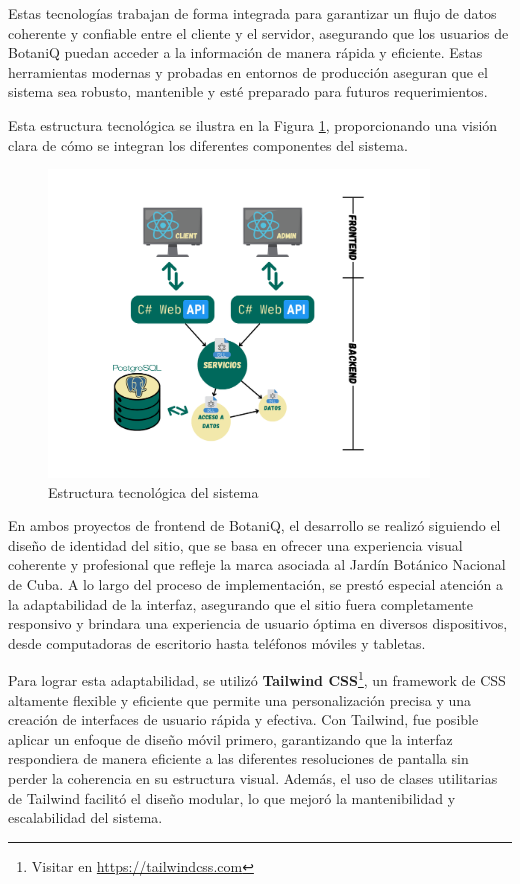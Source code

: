 Estas tecnologías trabajan de forma integrada para garantizar 
un flujo de datos coherente y confiable entre el cliente y el servidor, asegurando que los usuarios de 
BotaniQ puedan acceder a la información de manera rápida y eficiente. Estas herramientas modernas y 
probadas en entornos de producción aseguran que el sistema sea robusto, mantenible y esté preparado para 
futuros requerimientos.

Esta estructura tecnológica se ilustra en la Figura \ref{fig:techs}, proporcionando una visión 
clara de cómo se integran los diferentes componentes del sistema.

\begin{figure}[ht!]
    \centering
    \includegraphics[width=0.9\textwidth]{Images/techs.png}
    \caption{Estructura tecnológica del sistema}
    \label{fig:techs}
\end{figure}

En ambos proyectos de frontend de BotaniQ, el desarrollo se realizó siguiendo el diseño de identidad del sitio, 
que se basa en ofrecer una experiencia visual coherente y profesional que refleje la marca asociada al 
Jardín Botánico Nacional de Cuba. A lo largo del proceso de implementación, se prestó especial atención a la 
adaptabilidad de la interfaz, asegurando que el sitio fuera completamente responsivo y brindara una experiencia 
de usuario óptima en diversos dispositivos, desde computadoras de escritorio hasta teléfonos móviles y tabletas.

Para lograr esta adaptabilidad, se utilizó 
\textbf{Tailwind CSS}\footnote{Visitar en \url{https://tailwindcss.com}},
un framework de CSS altamente flexible y eficiente que permite una personalización precisa y una creación de 
interfaces de usuario rápida y efectiva. Con Tailwind, fue posible aplicar un enfoque de diseño móvil primero, 
garantizando que la interfaz respondiera de manera eficiente a las diferentes resoluciones de pantalla sin 
perder la coherencia en su estructura visual. Además, el uso de clases utilitarias de Tailwind facilitó el 
diseño modular, lo que mejoró la mantenibilidad y escalabilidad del sistema.

